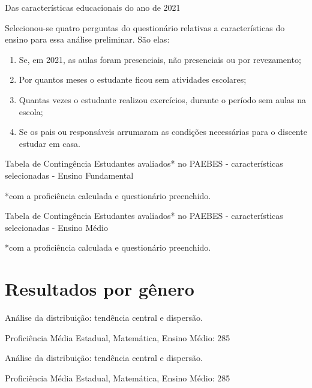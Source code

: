 \documentclass[
  ignorenonframetext,
]{beamer}
\providecommand{\tightlist}{%
  \setlength{\itemsep}{0pt}\setlength{\parskip}{0pt}}
\begin{document}
\begin{frame}
Das características educacionais do ano de 2021

Selecionou-se quatro perguntas do questionário relativas a
características do ensino para essa análise preliminar. São elas:

\begin{enumerate}[<+->]
\tightlist
\item
  Se, em 2021, as aulas foram presenciais, não presenciais ou por
  revezamento;
\item
  Por quantos meses o estudante ficou sem atividades escolares;
\item
  Quantas vezes o estudante realizou exercícios, durante o período sem
  aulas na escola;
\item
  Se os pais ou responsáveis arrumaram as condições necessárias para o
  discente estudar em casa.
\end{enumerate}
\end{frame}

\begin{frame}{Tabela de Contingência}
\protect\hypertarget{tabela-de-continguxeancia-4}{}
Estudantes avaliados* no PAEBES - características selecionadas - Ensino
Fundamental

*com a proficiência calculada e questionário preenchido.
\end{frame}

\begin{frame}{Tabela de Contingência}
\protect\hypertarget{tabela-de-continguxeancia-5}{}
Estudantes avaliados* no PAEBES - características selecionadas - Ensino
Médio

*com a proficiência calculada e questionário preenchido.
\end{frame}

\hypertarget{resultados-por-guxeanero-1}{%
\section{Resultados por gênero}\label{resultados-por-guxeanero-1}}

\begin{frame}
Análise da distribuição: tendência central e dispersão.

Proficiência Média Estadual, Matemática, Ensino Médio: 285
\end{frame}

\begin{frame}
Análise da distribuição: tendência central e dispersão.

Proficiência Média Estadual, Matemática, Ensino Médio: 285
\end{frame}
\end{document}
